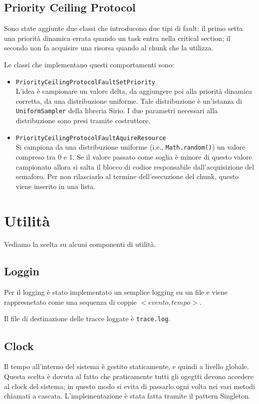 \subsection{Priority Ceiling Protocol}
Sono state aggiunte due classi che introducono due tipi di fault: il primo setta una priorità dinamica errata quando un task entra nella critical section; il secondo non fa acquisire una risorsa quando al chunk che la utilizza.

\myskip

Le classi che implementano questi comportamenti sono:
\begin{itemize}
    \item \texttt{PriorityCeilingProtocolFaultSetPriority} \\
        L'idea è campionare un valore delta, da aggiungere poi alla priorità dinamica corretta, da una distribuzione uniforme. Tale distribuzione è un'istanza di \texttt{UniformSampler} della libreria Sirio. I due parametri necessari alla distribuzione sono presi tramite costruttore.
    \item \texttt{PriorityCeilingProtocolFaultAquireResource} \\
        Si campiona da una distribuzione uniforme (i.e., \texttt{Math.random()}) un valore compreso tra 0 e 1. Se il valore passato come soglia è minore di questo valore campionato allora si salta il blocco di codice responsabile dall'acquisizione del semaforo. Per non rilasciarlo al termine dell'esecuzione del chunk, questo viene inserito in una lista.
\end{itemize}

\section{Utilità}
Vediamo la scelta su alcuni componenti di utilità.

\subsection{Loggin}
Per il logging è stato implementato un semplice logging su un file e viene rappresnetato come una sequenza di coppie $<evento,tempo>$.

Il file di destinazione delle tracce loggate è \texttt{trace.log}.

\subsection{Clock}
\label{subsec:clock}
Il tempo all'interno del sistema è gestito staticamente, e quindi a livello globale. Questa scelta è dovuta al fatto che praticamente tutti gli ogegtti devono accedere al clock del sistema; in questo modo si evita di passarlo ogni volta nei vari metodi chiamati a cascata. L'implementazione è stata fatta tramite il pattern Singleton.

